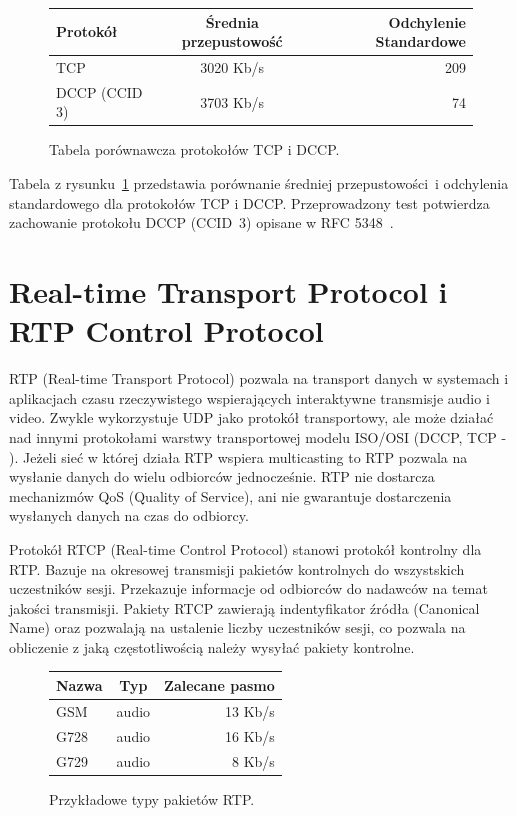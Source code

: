 \begin{figure}
	\centering
	\begin{tabular}{ l | c | r }
  		Protokół & Średnia przepustowość & Odchylenie Standardowe \\
  		\hline
  		TCP & 3020 Kb/s & 209 \\
  		DCCP (CCID 3) & 3703 Kb/s & 74 \\
	\end{tabular}
	\caption{Tabela porównawcza protokołów TCP i DCCP.}
	\label{TCP_DCCP_table}
\end{figure}

Tabela z rysunku~\ref{TCP_DCCP_table} przedstawia porównanie średniej przepustowości~i odchylenia standardowego dla protokołów TCP i DCCP. Przeprowadzony test potwierdza zachowanie protokołu DCCP (CCID~3) opisane w RFC 5348~\cite{RFC5348}. 

\section{Real-time Transport Protocol i RTP Control Protocol}

RTP (Real-time Transport Protocol) pozwala na transport danych w systemach i aplikacjach czasu rzeczywistego wspierających interaktywne transmisje audio i video. Zwykle wykorzystuje UDP jako protokół transportowy, ale może działać nad innymi protokołami warstwy transportowej modelu ISO/OSI (DCCP, TCP - \cite{RFC3550, RFC5762}). Jeżeli sieć w której działa RTP wspiera multicasting to RTP pozwala na wysłanie danych do wielu odbiorców jednocześnie. RTP nie dostarcza mechanizmów QoS (Quality of Service), ani nie gwarantuje dostarczenia wysłanych danych na czas do odbiorcy.

Protokół RTCP (Real-time Control Protocol) stanowi protokół kontrolny dla RTP. Bazuje na okresowej transmisji pakietów kontrolnych do wszystskich uczestników sesji. Przekazuje informacje od odbiorców do nadawców na temat jakości transmisji. Pakiety RTCP zawierają indentyfikator źródła (Canonical Name) oraz pozwalają na ustalenie liczby uczestników sesji, co pozwala na obliczenie z jaką częstotliwością należy wysyłać pakiety kontrolne.

\begin{figure}[h!]
	\centering
	\begin{tabular}{ l | c | r }
  		Nazwa & Typ & Zalecane pasmo \\
  		\hline
  		GSM & audio & 13 Kb/s \\
  		G728 & audio & 16 Kb/s  \\
  		G729 & audio & 8 Kb/s  \\
	\end{tabular}
	\caption{Przykładowe typy pakietów RTP.}
	\label{RTP_table}
\end{figure}

